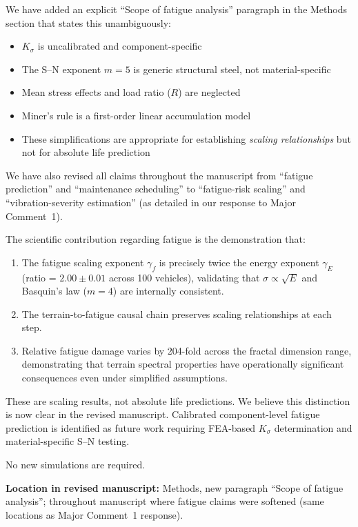 \documentclass[11pt]{article}
\newcommand{\revloc}[1]{\noindent\textbf{Location in revised manuscript:} #1\medskip}
\begin{document}
We have added an explicit ``Scope of fatigue analysis'' paragraph in the Methods section that states this unambiguously:

\begin{itemize}[leftmargin=*]
\item $K_\sigma$ is uncalibrated and component-specific
\item The S--N exponent $m = 5$ is generic structural steel, not material-specific
\item Mean stress effects and load ratio ($R$) are neglected
\item Miner's rule is a first-order linear accumulation model
\item These simplifications are appropriate for establishing \emph{scaling relationships} but not for absolute life prediction
\end{itemize}

\noindent We have also revised all claims throughout the manuscript from ``fatigue prediction'' and ``maintenance scheduling'' to ``fatigue-risk scaling'' and ``vibration-severity estimation'' (as detailed in our response to Major Comment~1).

The scientific contribution regarding fatigue is the demonstration that:
\begin{enumerate}[leftmargin=*]
\item The fatigue scaling exponent $\gamma_f$ is precisely twice the energy exponent $\gamma_E$ (ratio = $2.00 \pm 0.01$ across 100 vehicles), validating that $\sigma \propto \sqrt{E}$ and Basquin's law ($m = 4$) are internally consistent.
\item The terrain-to-fatigue causal chain preserves scaling relationships at each step.
\item Relative fatigue damage varies by 204-fold across the fractal dimension range, demonstrating that terrain spectral properties have operationally significant consequences even under simplified assumptions.
\end{enumerate}

\noindent These are scaling results, not absolute life predictions. We believe this distinction is now clear in the revised manuscript. Calibrated component-level fatigue prediction is identified as future work requiring FEA-based $K_\sigma$ determination and material-specific S--N testing.

No new simulations are required.

\revloc{Methods, new paragraph ``Scope of fatigue analysis''; throughout manuscript where fatigue claims were softened (same locations as Major Comment~1 response).}
\end{document}
